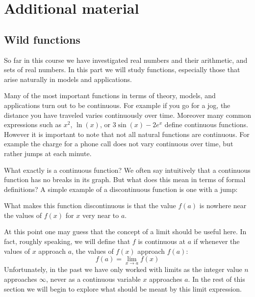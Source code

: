 \documentclass[11pt,oneside]{amsbook}
\theoremstyle{definition}
\theoremstyle{plain}
\theoremstyle{definition}
\theoremstyle{remark}
\numberwithin{equation}{section}
\numberwithin{figure}{section}
\begin{document}
\iffalse
\chapter{Additional material}

\section{Wild functions}

So far in this course we have investigated real numbers and their arithmetic, and sets of real numbers. In this part we will study functions, especially those that arise naturally in models and applications.

Many of the most important functions in terms of theory, models, and applications turn out to be continuous. For example if you go for a jog, the distance you have traveled varies continuously over time. Moreover many common expressions such as $x^2$, $\ln(x)$, or $3\sin(x)-2e^x$ define continuous functions. However it is important to note that not all natural functions are continuous. For example the charge for a phone call does not vary continuous over time, but rather jumps at each minute.

What exactly is a continuous function? We often say intuitively that a continuous function has no breaks in its graph. But what does this mean in terms of formal definitions? A simple example of a discontinuous function is one with a jump:
\begin{center}
\end{center}
What makes this function discontinuous is that the value $f(a)$ is nowhere near the values of $f(x)$ for $x$ very near to $a$.

At this point one may guess that the concept of a limit should be useful here. In fact, roughly speaking, we will define that $f$ is continuous at $a$ if whenever the values of $x$ approach $a$, the values of $f(x)$ approach $f(a)$:
\[f(a)=\lim_{x\to a}f(x)
\]
Unfortunately, in the past we have only worked with limits as the integer value $n$ approaches $\infty$, never as a continuous variable $x$ approaches $a$. In the rest of this section we will begin to explore what should be meant by this limit expression.
\end{document}
